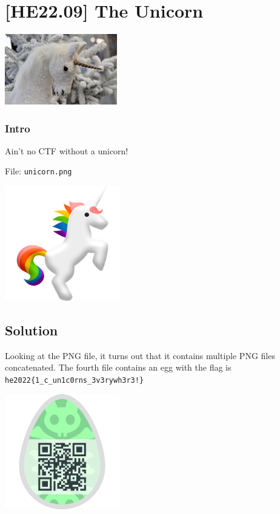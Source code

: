 
\hypertarget{he22.09}{%
\chapter{[HE22.09] The Unicorn}\label{he22.09}}

\begin{marginfigure}
	\includegraphics[width=49mm]{level3/challenge9.jpg}
\end{marginfigure}
\subsection{Intro}
Ain't no CTF without a unicorn!

File: \verb+unicorn.png+
\begin{marginfigure}
\includegraphics[width=50mm]{level3/unicorn.png}
\end{marginfigure}
\section{Solution}\label{hv21.09-solution}

Looking at the PNG file, it turns out that it contains multiple PNG files
concatenated.  The fourth file contains an egg with the flag is
\verb+he2022{1_c_un1c0rns_3v3rywh3r3!}+

\begin{marginfigure}
	\includegraphics[width=50mm]{level3/unicorn4.png}
\end{marginfigure}


